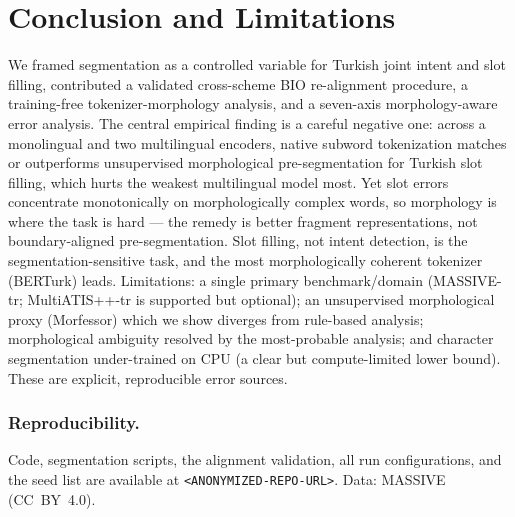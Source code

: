 \documentclass[runningheads]{llncs}
\begin{document}
\section{Conclusion and Limitations}
We framed segmentation as a controlled variable for Turkish joint intent and slot
filling, contributed a validated cross-scheme BIO re-alignment procedure, a
training-free tokenizer-morphology analysis, and a seven-axis morphology-aware
error analysis. The central empirical finding is a careful negative one: across a
monolingual and two multilingual encoders, native subword tokenization matches or
outperforms unsupervised morphological pre-segmentation for Turkish slot filling,
which hurts the weakest multilingual model most. Yet slot errors concentrate
monotonically on morphologically complex words, so morphology is where the task is
hard --- the remedy is better fragment representations, not boundary-aligned
pre-segmentation. Slot filling, not intent detection, is the segmentation-sensitive
task, and the most morphologically coherent tokenizer (BERTurk) leads.
Limitations: a single primary benchmark/domain (MASSIVE-tr; MultiATIS++-tr is
supported but optional); an unsupervised morphological proxy (Morfessor) which we
show diverges from rule-based analysis; morphological ambiguity resolved by the
most-probable analysis; and character segmentation under-trained on CPU (a clear
but compute-limited lower bound). These are explicit, reproducible error sources.

\subsubsection*{Reproducibility.} Code, segmentation scripts, the alignment
validation, all run configurations, and the seed list are available at
\texttt{<ANONYMIZED-REPO-URL>}. %
Data: MASSIVE (CC~BY~4.0).



\end{document}
